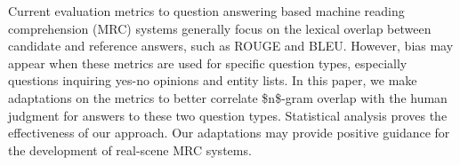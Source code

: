 Current evaluation metrics to question answering based machine reading comprehension (MRC) systems generally focus on the lexical overlap between candidate and reference answers, such as ROUGE and BLEU. However, bias may appear when these metrics are used for specific question types, especially questions inquiring yes-no opinions and entity lists. In this paper, we make adaptations on the metrics to better correlate \$n\$-gram overlap with the human judgment for answers to these two question types. Statistical analysis proves the effectiveness of our approach. Our adaptations may provide positive guidance for the development of real-scene MRC systems.
